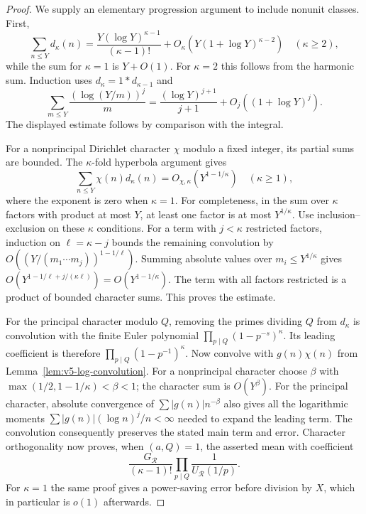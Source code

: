 \begin{proof}
We supply an elementary progression argument to include nonunit classes.
First,
\[
 \sum_{n\leq Y}d_\kappa(n)
   =\frac{Y(\log Y)^{\kappa-1}}{(\kappa-1)!}
       +O_\kappa(Y(1+\log Y)^{\kappa-2})\quad(\kappa\geq2),
\]
while the sum for $\kappa=1$ is $Y+O(1)$.
For $\kappa=2$ this follows from the harmonic sum. Induction uses
$d_\kappa=1*d_{\kappa-1}$ and
\[
 \sum_{m\leq Y}\frac{(\log(Y/m))^j}{m}
       =\frac{(\log Y)^{j+1}}{j+1}+O_j((1+\log Y)^j).
\]
The displayed estimate follows by comparison with the integral.

For a nonprincipal Dirichlet character $\chi$ modulo a fixed integer,
its partial sums are bounded. The $\kappa$-fold hyperbola argument gives
\[
 \sum_{n\leq Y}\chi(n)d_\kappa(n)
       =O_{\chi,\kappa}(Y^{1-1/\kappa})\quad(\kappa\geq1),
\]
where the exponent is zero when $\kappa=1$.
For completeness, in the sum over $\kappa$ factors with product at most
$Y$, at least one factor is at most $Y^{1/\kappa}$.
Use inclusion--exclusion on these $\kappa$ conditions.
For a term with $j<\kappa$ restricted factors, induction on
$\ell=\kappa-j$ bounds the remaining convolution by
$O((Y/(m_1\cdots m_j))^{1-1/\ell})$. Summing absolute values over
$m_i\leq Y^{1/\kappa}$ gives
$O(Y^{1-1/\ell+j/(\kappa\ell)})=O(Y^{1-1/\kappa})$.
The term with all factors restricted is a product of bounded character
sums. This proves the estimate.

For the principal character modulo $Q$, removing the primes dividing
$Q$ from $d_\kappa$ is convolution with the finite Euler polynomial
$\prod_{p\mid Q}(1-p^{-s})^\kappa$. Its leading coefficient is
therefore $\prod_{p\mid Q}(1-p^{-1})^\kappa$.
Now convolve with $g(n)\chi(n)$ from
Lemma~\ref{lem:v5-log-convolution}. For a nonprincipal character choose
$\beta$ with $\max(1/2,1-1/\kappa)<\beta<1$; the character sum is
$O(Y^\beta)$. For the principal character, absolute convergence of
$\sum |g(n)|n^{-\beta}$ also gives all the logarithmic moments
$\sum |g(n)|(\log n)^j/n<\infty$ needed to expand the leading term.
The convolution consequently preserves the stated main term and error.
Character orthogonality now proves, when $(a,Q)=1$, the asserted mean
with coefficient
\[
 \frac{G_{\mathcal R}}{(\kappa-1)!}
       \prod_{p\mid Q}\frac1{U_{\mathcal R}(1/p)}.
\]
For $\kappa=1$ the same proof gives a power-saving error before division
by $X$, which in particular is $o(1)$ afterwards.


\end{proof}
